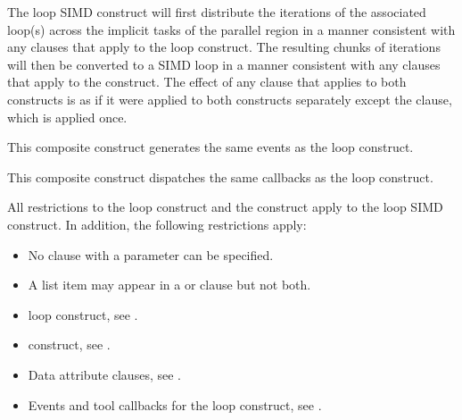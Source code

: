 \descr
The loop SIMD construct will first distribute the iterations of the associated loop(s)
across the implicit tasks of the parallel region in a manner consistent with any clauses
that apply to the loop construct. The resulting chunks of iterations will then be converted
to a SIMD loop in a manner consistent with any clauses that apply to the 
construct. The effect of any clause that applies to both constructs is as if it were applied to both constructs separately except the  clause, which is applied once.

\events

This composite construct generates the same events as the loop construct.

\tools

This composite construct dispatches the same callbacks as the loop construct.

\restrictions
All restrictions to the loop construct and the  construct apply to the loop SIMD
construct. In addition, the following restrictions apply:

\begin{itemize}
\item No  clause with a parameter can be specified.
\item A list item may appear in a  or  clause but not both.
\end{itemize}

\begin{samepage}
\crossreferences
\begin{itemize}
\item loop construct, see
.

\item {} construct, see
.

\item Data attribute clauses, see
.

\item Events and tool callbacks for the loop construct, see
.
\end{itemize}
\end{samepage}

